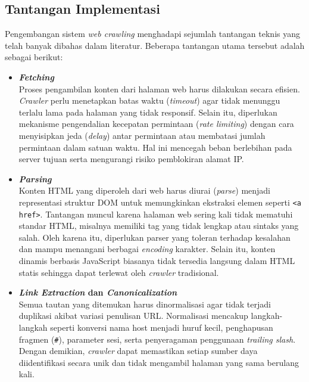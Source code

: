 \subsection{Tantangan Implementasi}
\label{subsec:0204-tantangan-crawling}

Pengembangan sistem \textit{web crawling} menghadapi sejumlah tantangan teknis yang telah banyak dibahas dalam literatur. Beberapa tantangan utama tersebut adalah sebagai berikut:

\begin{itemize}
    \item \textbf{\textit{Fetching}} \\
    Proses pengambilan konten dari halaman web harus dilakukan secara efisien. \textit{Crawler} perlu menetapkan batas waktu (\textit{timeout}) agar tidak menunggu terlalu lama pada halaman yang tidak responsif. Selain itu, diperlukan mekanisme pengendalian kecepatan permintaan (\textit{rate limiting}) dengan cara menyisipkan jeda (\textit{delay}) antar permintaan atau membatasi jumlah permintaan dalam satuan waktu. Hal ini mencegah beban berlebihan pada server tujuan serta mengurangi risiko pemblokiran alamat IP.

    \item \textbf{\textit{Parsing}} \\
    Konten HTML yang diperoleh dari web harus diurai (\textit{parse}) menjadi representasi struktur DOM untuk memungkinkan ekstraksi elemen seperti \texttt{<a href>}. Tantangan muncul karena halaman web sering kali tidak mematuhi standar HTML, misalnya memiliki tag yang tidak lengkap atau sintaks yang salah. Oleh karena itu, diperlukan parser yang toleran terhadap kesalahan dan mampu menangani berbagai \textit{encoding} karakter. Selain itu, konten dinamis berbasis JavaScript biasanya tidak tersedia langsung dalam HTML statis sehingga dapat terlewat oleh \textit{crawler} tradisional.

    \item \textbf{\textit{Link Extraction} dan \textit{Canonicalization}} \\
    Semua tautan yang ditemukan harus dinormalisasi agar tidak terjadi duplikasi akibat variasi penulisan URL. Normalisasi mencakup langkah-langkah seperti konversi nama host menjadi huruf kecil, penghapusan fragmen (\texttt{\#}), parameter sesi, serta penyeragaman penggunaan \textit{trailing slash}. Dengan demikian, \textit{crawler} dapat memastikan setiap sumber daya diidentifikasi secara unik dan tidak mengambil halaman yang sama berulang kali.


\end{itemize}
